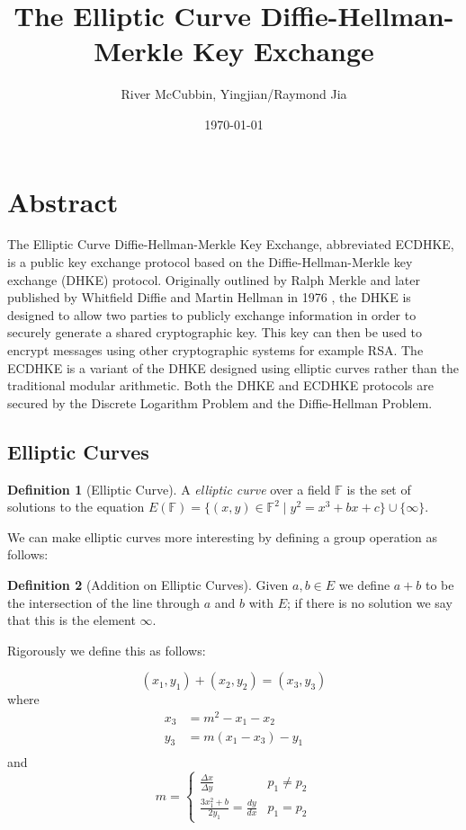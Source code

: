 \documentclass{article}
\title{The Elliptic Curve Diffie-Hellman-Merkle Key Exchange}
\author{River McCubbin, Yingjian/Raymond Jia}
\date{\today}
\theoremstyle{plain}
\theoremstyle{definition}
\newtheorem{definition}{Definition}
\newcommand{\bb}[1]{\mathbb{#1}}
\begin{document}
\maketitle

\section{Abstract}\label{abstract}

        The Elliptic Curve Diffie-Hellman-Merkle Key Exchange, abbreviated ECDHKE, is a public key exchange protocol based on the Diffie-Hellman-Merkle key exchange (DHKE) protocol.
        Originally outlined by Ralph Merkle and later published by Whitfield Diffie and Martin Hellman in 1976 \cite{DHKE}, the DHKE is designed to allow two parties to publicly exchange information in order to securely generate a shared cryptographic key.
        This key can then be used to encrypt messages using other cryptographic systems for example RSA.
        The ECDHKE is a variant of the DHKE designed using elliptic curves rather than the traditional modular arithmetic.
        Both the DHKE and ECDHKE protocols are secured by the Discrete Logarithm Problem and the Diffie-Hellman Problem.

        \subsection{Elliptic Curves}\label{EC}

                \begin{definition}[Elliptic Curve]
                        A \textit{elliptic curve} over a field $\bb{F}$ is the set of solutions to the equation $E(\bb{F}) = \{(x, y) \in \bb{F}^2 \mid y^2 = x^3 + bx + c\} \cup \{\infty\}$.
                \end{definition}
                
                We can make elliptic curves more interesting by defining a group operation as follows:

                \begin{definition}[Addition on Elliptic Curves]
                        Given $a, b \in E$ we define $a + b$ to be the intersection of the line through $a$ and $b$ with $E$; if there is no solution we say that this is the element $\infty$.

                        Rigorously we define this as follows:

                        $$(x_1, y_1) + (x_2, y_2) = (x_3, y_3)$$ 
                        where
                        \begin{align*}
                        x_3 &= m^2 - x_1 - x_2\\
                        y_3 &= m(x_1 - x_3) - y_1\\
                        \end{align*}
                        and
                        $$m = \begin{cases} \frac{\Delta x}{\Delta y} & p_1 \neq p_2 \\ \frac{3x_1^2 + b}{2y_1} = \frac{dy}{dx} & p_1 = p_2 \end{cases}$$
                \end{definition}
\end{document}
